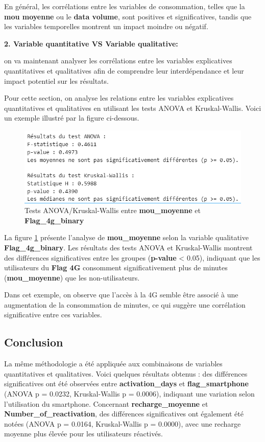 En général, les corrélations entre les variables de consommation, telles que la \textbf{mou moyenne} ou le \textbf{data volume}, sont positives et significatives, tandis que les variables temporelles montrent un impact moindre ou négatif.

\textbf{2. Variable quantitative VS Variable qualitative:}

on va maintenant analyser les corrélations entre les variables explicatives quantitatives et qualitatives afin de comprendre leur interdépendance et leur impact potentiel sur les résultats.

Pour cette section, on analyse les relations entre les variables explicatives quantitatives et qualitatives en utilisant les tests ANOVA et Kruskal-Wallis. Voici un exemple illustré par la figure ci-dessous.

\begin{figure}[H]
    \centering
    \includegraphics[width=0.7\linewidth]{capture_sas_36.png}
    \caption{Tests ANOVA/Kruskal-Wallis entre \textbf{mou\_moyenne} et \textbf{Flag\_4g\_binary}}
    \label{flag4g_mou}
\end{figure}

La figure \ref{flag4g_mou} présente l'analyse de \textbf{mou\_moyenne} selon la variable qualitative \textbf{Flag\_4g\_binary}. Les résultats des tests ANOVA et Kruskal-Wallis montrent des différences significatives entre les groupes (\textbf{p-value} < 0.05), indiquant que les utilisateurs du \textbf{Flag 4G} consomment significativement plus de minutes (\textbf{mou\_moyenne}) que les non-utilisateurs.

Dans cet exemple, on observe que l'accès à la 4G semble être associé à une augmentation de la consommation de minutes, ce qui suggère une corrélation significative entre ces variables.

\subsection*{Conclusion }
La même méthodologie a été appliquée aux combinaisons de variables quantitatives et qualitatives. Voici quelques résultats obtenus : des différences significatives ont été observées entre \textbf{activation\_days} et \textbf{flag\_smartphone} (ANOVA p = 0.0232, Kruskal-Wallis p = 0.0006), indiquant une variation selon l'utilisation du smartphone. Concernant \textbf{recharge\_moyenne} et \textbf{Number\_of\_reactivation}, des différences significatives ont également été notées (ANOVA p = 0.0164, Kruskal-Wallis p = 0.0000), avec une recharge moyenne plus élevée pour les utilisateurs réactivés. 


